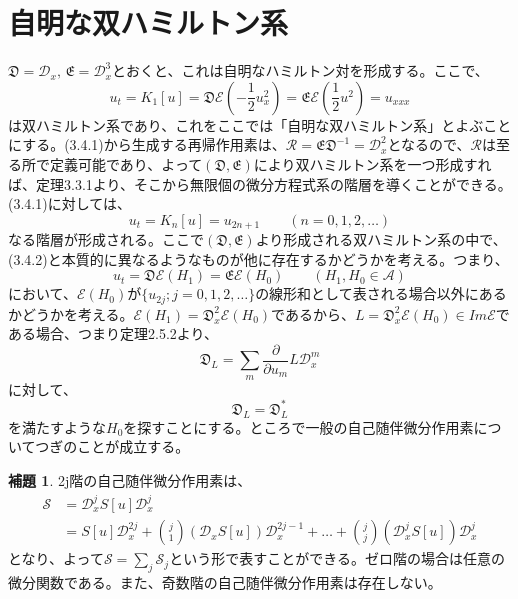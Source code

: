 \documentclass[a4paper, 11pt]{report}
\theoremstyle{definition}
\newtheorem{lemma}{補題}[section]
\begin{document}
\section{自明な双ハミルトン系}

 $\mathfrak{D}=\mathcal{D}_x, \, \mathfrak{E}=\mathcal{D}_x^3$とおくと、これは自明なハミルトン対を形成する。ここで、
\begin{equation}
u_t = K_1[u] = \mathfrak{D}\mathcal{E}(-\frac{1}{2}u_x^2) = \mathfrak{E}\mathcal{E}(\frac{1}{2}u^2) = u_{xxx}  %
\end{equation}
は双ハミルトン系であり、これをここでは「自明な双ハミルトン系」とよぶことにする。(3.4.1)から生成する再帰作用素は、$\mathcal{R}=\mathfrak{E}\mathfrak{D}^{-1}=\mathcal{D}_x^2$となるので、$\mathcal{R}$は至る所で定義可能であり、よって$(\mathfrak{D},\mathfrak{E})$により双ハミルトン系を一つ形成すれば、定理3.3.1より、そこから無限個の微分方程式系の階層を導くことができる。(3.4.1)に対しては、
\begin{equation}
u_t = K_n[u] = u_{2n+1} \qquad (n=0,1,2,\dots )  %
\end{equation}
なる階層が形成される。ここで$(\mathfrak{D},\mathfrak{E})$より形成される双ハミルトン系の中で、(3.4.2)と本質的に異なるようなものが他に存在するかどうかを考える。つまり、
\begin{equation*}
u_t = \mathfrak{D}\mathcal{E}(H_1) = \mathfrak{E}\mathcal{E}(H_0) \qquad (H_1, H_0\in\mathcal{A})
\end{equation*}
において、$\mathcal{E}(H_0)$が$\{ u_{2j};j=0,1,2,\dots \}$の線形和として表される場合以外にあるかどうかを考える。$\mathcal{E}(H_1)=\mathfrak{D}_x^2\mathcal{E}(H_0)$であるから、$L=\mathfrak{D}_x^2\mathcal{E}(H_0)\in Im\mathcal{E}$である場合、つまり定理2.5.2より、
\begin{equation*}
\mathfrak{D}_L = \sum_m\frac{\partial}{\partial u_m}L\mathcal{D}_x^m
\end{equation*}
に対して、
\begin{equation}
\mathfrak{D}_L = \mathfrak{D}_L^*  %
\end{equation}
を満たすような$H_0$を探すことにする。ところで一般の自己随伴微分作用素についてつぎのことが成立する。

\begin{lemma}
 2j階の自己随伴微分作用素は、
\begin{align*}
\mathcal{S} &= \mathcal{D}_x^jS[u]\mathcal{D}_x^j\\
&= S[u]\mathcal{D}_x^{2j}+\binom{j}{1}(\mathcal{D}_xS[u])\mathcal{D}_x^{2j-1}+\dots +\binom{j}{j}(\mathcal{D}_x^jS[u])\mathcal{D}_x^j
\end{align*}
となり、よって$\mathcal{S}=\sum_j\mathcal{S}_j$という形で表すことができる。ゼロ階の場合は任意の微分関数である。また、奇数階の自己随伴微分作用素は存在しない。
\end{lemma}
\end{document}
